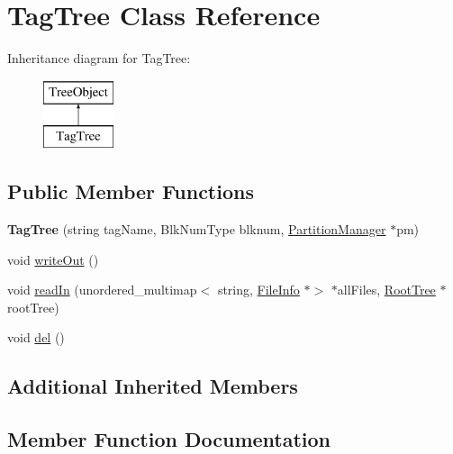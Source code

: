 \hypertarget{classTagTree}{}\section{Tag\+Tree Class Reference}
\label{classTagTree}
Inheritance diagram for Tag\+Tree\+:\begin{figure}[H]
\begin{center}
\leavevmode
\includegraphics[height=2.000000cm]{classTagTree}
\end{center}
\end{figure}
\subsection*{Public Member Functions}
\begin{DoxyCompactItemize}
\item 
\mbox{\label{classTagTree_a80b23fa47a18727a248c3db1e8b2ed83}} 
{\bfseries Tag\+Tree} (string tag\+Name, Blk\+Num\+Type blknum, \mbox{\hyperlink{classPartitionManager}{Partition\+Manager}} $\ast$pm)
\item 
void \mbox{\hyperlink{classTagTree_ae316c2517c607547f02ce43b63a6316d}{write\+Out}} ()
\item 
void \mbox{\hyperlink{classTagTree_a2e72921ccc19667331c64d3d0100b269}{read\+In}} (unordered\+\_\+multimap$<$ string, \mbox{\hyperlink{classFileInfo}{File\+Info}} $\ast$$>$ $\ast$all\+Files, \mbox{\hyperlink{classRootTree}{Root\+Tree}} $\ast$root\+Tree)
\item 
void \mbox{\hyperlink{classTagTree_ad8108969f4d28b938e55c8339f19db35}{del}} ()
\end{DoxyCompactItemize}
\subsection*{Additional Inherited Members}


\subsection{Member Function Documentation}
\mbox{\label{classTagTree_ad8108969f4d28b938e55c8339f19db35}} 
